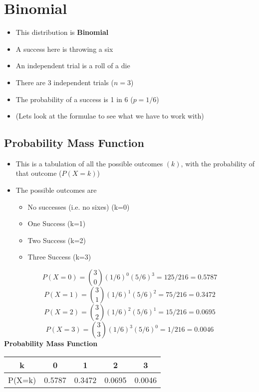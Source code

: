 \section*{Binomial }


\begin{itemize}
\item This distribution is \textbf{Binomial}
\item A success here is throwing a six
\item An independent trial is a roll of a die
\item There are 3 independent trials ($n=3$)
\item The probability of a success is 1 in 6 ($p=1/6$)
\item (Lets look at the formulae to see what we have to work with)
\end{itemize}


\subsection{Probability Mass Function}

\begin{itemize}
\item This is a tabulation of all the possible outcomes $(k)$, with the probability of that outcome ($P(X=k)$)
\item The possible outcomes are
\begin{itemize}
\item No successes (i.e. no sixes) (k=0)
\item One Success (k=1)
\item Two Success (k=2)
\item Three Success (k=3)
\end{itemize}
\end{itemize}










\[P(X=0) =  { 3 \choose 0} (1/6)^0 (5/6)^3 = 125/216 = 0.5787 \]
\bigskip
\[P(X=1) =  { 3 \choose 1} (1/6)^1 (5/6)^2 = 75/216 = 0.3472\]
\bigskip
\[P(X=2) =  { 3 \choose 2} (1/6)^2 (5/6)^1 = 15/216 = 0.0695\]
\bigskip
\[P(X=3) =  { 3 \choose 3} (1/6)^3 (5/6)^0 = 1/216 = 0.0046\]
\bigskip
\textbf{Probability Mass Function}
\begin{center}
\begin{tabular}{|c|c|c|c|c|}
\hline
k & 0 & 1 & 2 & 3 \\ \hline
P(X=k) & 0.5787 & 0.3472 & 0.0695 & 0.0046 \\
\hline
\end{tabular}
\end{center}
\newpage